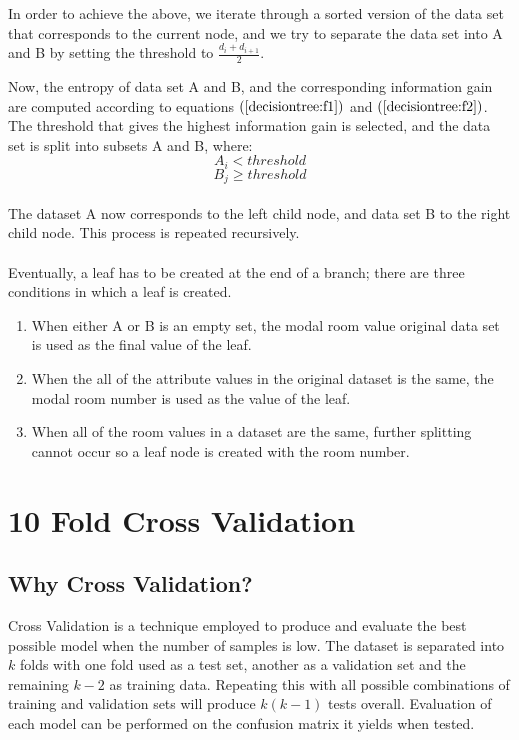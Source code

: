 \documentclass{article}
\begin{document}
In order to achieve the above, we iterate through a sorted version of the data set that corresponds to the current node, and we try to separate the data set into A and B by setting the threshold to $\frac{d_{i} + d_{i+1}}{2}$.

Now, the entropy of data set A and B, and the corresponding information gain are computed according to equations $(\ref{decisiontree:f1})$ and $(\ref{decisiontree:f2})$. The threshold that gives the highest information gain is selected, and the data set is split into subsets A and B, where: $$A_{i} < threshold $$ $$B_{j} \geq threshold$$
\\
The dataset A now corresponds to the left child node, and data set B to the right child node. This process is repeated recursively.
\\\\
Eventually, a leaf has to be created at the end of a branch; there are three conditions in which a leaf is created.
\begin{enumerate}
    \item When either A or B is an empty set, the modal room value original data set is used as the final value of the leaf.
    \item When the all of the attribute values in the original dataset is the same, the modal room number is used as the value of the leaf.
    \item When all of the room values in a dataset are the same, further splitting cannot occur so a leaf node is created with the room number.
\end{enumerate}

\section{10 Fold Cross Validation}

\subsection{Why Cross Validation?}
Cross Validation is a technique employed to produce and evaluate the best possible model when the number of samples is low. The dataset is separated into $k$ folds with one fold used as a test set, another as a validation set and the remaining $k-2$ as training data. Repeating this with all possible combinations of training and validation sets will produce $k(k-1)$ tests overall. Evaluation of each model can be performed on the confusion matrix it yields when tested.
\end{document}
